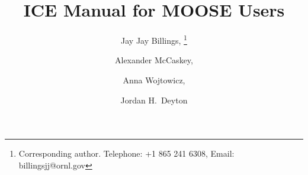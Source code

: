 \documentclass{report}
\begin{document}
\begin{titlepage}

\title{ICE Manual for MOOSE Users} 
\author[a,b]{Jay Jay Billings, \thanks{Corresponding author.
Telephone:
+1 865 241 6308, Email: billingsjj@ornl.gov}} %
\author[a]{Alexander McCaskey, }
\author[a]{Anna Wojtowicz, }
\author[a]{Jordan H.\ Deyton}
\end{titlepage}
\maketitle

\tableofcontents






\renewcommand{\bibname}{Online Resources}
\nocite{*}


%
%
%
%
\end{document}
